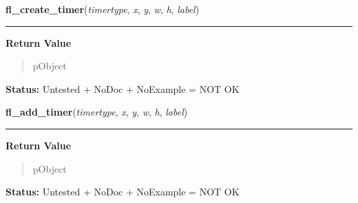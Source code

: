     \vspace{0.5ex}

\hspace{.8\funcindent}\begin{boxedminipage}{\funcwidth}

    \raggedright \textbf{fl\_create\_timer}(\textit{timertype}, \textit{x}, \textit{y}, \textit{w}, \textit{h}, \textit{label})

    \vspace{-1.5ex}

    \rule{\textwidth}{0.5\fboxrule}
\setlength{\parskip}{2ex}
\setlength{\parskip}{1ex}
      \textbf{Return Value}
    \vspace{-1ex}

      \begin{quote}
      pObject

      \end{quote}

\textbf{Status:} Untested + NoDoc + NoExample = NOT OK



    \end{boxedminipage}

    \label{xformslib:library:fl_add_timer}

    \vspace{0.5ex}

\hspace{.8\funcindent}\begin{boxedminipage}{\funcwidth}

    \raggedright \textbf{fl\_add\_timer}(\textit{timertype}, \textit{x}, \textit{y}, \textit{w}, \textit{h}, \textit{label})

    \vspace{-1.5ex}

    \rule{\textwidth}{0.5\fboxrule}
\setlength{\parskip}{2ex}
\setlength{\parskip}{1ex}
      \textbf{Return Value}
    \vspace{-1ex}

      \begin{quote}
      pObject

      \end{quote}

\textbf{Status:} Untested + NoDoc + NoExample = NOT OK



    \end{boxedminipage}

